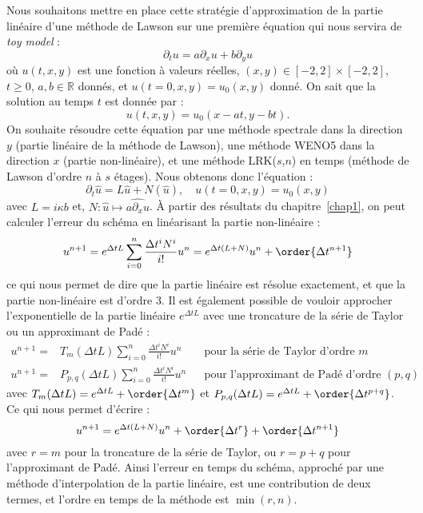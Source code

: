Nous souhaitons mettre en place cette stratégie d'approximation de la partie linéaire d'une méthode de Lawson sur une première équation qui nous servira de \emph{toy model} :
$$
  \partial_t u = a\partial_x u + b\partial_y u
$$
où $u(t,x,y)$ est une fonction à valeurs réelles, $(x,y)\in[-2,2]\times[-2,2]$, $t\geq0$, $a,b\in\mathbb{R}$ donnés, et $u(t=0,x,y)=u_0(x,y)$ donné. On sait que la solution au temps $t$ est donnée par :
$$
  u(t,x,y) = u_0(x-at,y-bt).
$$
On souhaite résoudre cette équation par une méthode spectrale dans la direction $y$ (partie linéaire de la méthode de Lawson), une méthode WENO5 dans la direction $x$ (partie non-linéaire), et une méthode LRK($s$,$n$) en temps (méthode de Lawson d'ordre $n$ à $s$ étages). Nous obtenons donc l'équation :
$$
  \partial_t \hat{u} = L\hat{u} + N(\hat{u}),\quad u(t=0,x,y) = u_0(x,y)
$$
avec $L = i\kappa b$ et, $N:\hat{u}\mapsto\widehat{a\partial_xu}$. À partir des résultats du chapitre~\ref{chap1}, on peut calculer l'erreur du schéma en linéarisant la partie non-linéaire :
$$
  u^{n+1} = e^{\Delta tL}\sum_{i=0}^{n}\frac{\Delta t^iN^i}{i!}u^n = e^{\Delta t (L+N)}u^n + \order{\Delta t^{n+1}}
$$
ce qui nous permet de dire que la partie linéaire est résolue exactement, et que la partie non-linéaire est d'ordre 3. Il est également possible de vouloir approcher l'exponentielle de la partie linéaire $e^{\Delta tL}$ avec une troncature de la série de Taylor ou un approximant de Padé :
$$
  \begin{aligned}
    u^{n+1} =& T_m(\Delta tL)\sum_{i=0}^{n}\frac{\Delta t^iN^i}{i!}u^n     & & \text{pour la série de Taylor d'ordre $m$} \\
    u^{n+1} =& P_{p,q}(\Delta tL)\sum_{i=0}^{n}\frac{\Delta t^iN^i}{i!}u^n & & \text{pour l'approximant de Padé d'ordre $(p,q)$}
  \end{aligned}
$$
avec $T_m(\Delta tL) = e^{\Delta tL}+\order{\Delta t^m}$ et $P_{p,q}(\Delta tL) = e^{\Delta tL}+\order{\Delta t^{p+q}}$. Ce qui nous permet d'écrire :
$$
  u^{n+1} = e^{\Delta t (L+N)}u^n + \order{\Delta t^r} + \order{\Delta t^{n+1}}
$$
avec $r=m$ pour la troncature de la série de Taylor, ou $r=p+q$ pour l'approximant de Padé. Ainsi l'erreur en temps du schéma, approché par une méthode d'interpolation de la partie linéaire, est une contribution de deux termes, et l'ordre en temps de la méthode est $\min(r,n)$.

